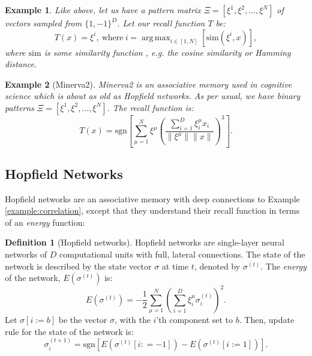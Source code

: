 \documentclass{article}
\DeclareMathOperator*{\argmax}{arg\,max}
\newtheorem{example}{Example}[subsection]
\theoremstyle{definition}
\newtheorem{definition}{Definition}[subsection]
\begin{document}
\begin{example}\label{example:argmax-am}
  Like above, let us have a pattern matrix $\Xi = [\xi^1, \xi^2,
  \dots, \xi^N]$ of
  vectors sampled from $\{1, -1\}^D$. Let our recall function $T$ be:
  \begin{equation}
    T(x) = \xi^i,~\text{where}~i = \argmax_{i \in [1, N]}
    [\text{sim}(\xi^i, x)],
  \end{equation}
  where $\text{sim}$ is some similarity function \parencite{kelly_memory_2017},
  e.g. the cosine similarity or Hamming distance.
\end{example}

\begin{example}[Minerva2]
  Minerva2 \parencite{hintzman_minerva_1984} is an associative memory
  used in cognitive
  science which is about as old as Hopfield networks. As per usual, we have
  binary patterns $\Xi = [\xi^1, \xi^2, \dots, \xi^N]$. The recall function is:
  \begin{equation}
    T(x) = \text{sgn} \left[ \sum^N_{\mu=1} \xi^\mu \left(
    \frac{\sum^D_{i=1} \xi^\mu_i x_i}{\|\xi^\mu\| \|x\|} \right)^3 \right].
  \end{equation}
\end{example}

\subsection{Hopfield Networks}\label{sec:hopfield-networks}

Hopfield networks
\parencites{hopfield_neural_1982,hopfield_neurons_1984} are an associative
memory with deep connections to Example \ref{example:correlation},
except that they
understand their recall function in terms of an \textit{energy} function:

\begin{definition}[Hopfield networks]
  Hopfield networks are single-layer neural networks of $D$ computational units
  with full, lateral connections. The state of the network is described
  by the state vector $\sigma$ at time $t$, denoted by $\sigma^{(t)}$.
  The \textit{energy} of the network, $E (\sigma^{(t)})$ is:
  \begin{equation}
    E(\sigma^{(t)}) = - \frac{1}{2} \sum^N_{\mu=1} \left(\sum^D_{i=1}
    \xi^\mu_i \sigma^{(t)}_i\right)^2.
  \end{equation}
  Let $\sigma[i := b]$ be the vector $\sigma$, with the $i$'th
  component set to $b$. Then,
  update rule for the state of the network is:
  \begin{equation}
    \sigma^{(t+1)}_i = \text{sgn} \left[ E(\sigma^{(t)}[i : = -1]) -
    E(\sigma^{(t)}[i := 1]) \right].
  \end{equation}
\end{definition}
\end{document}
